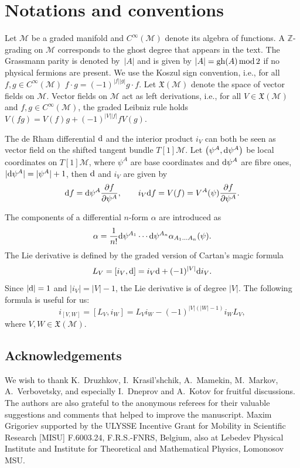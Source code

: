\documentclass[pdftex]{sigma}
\numberwithin{equation}{section}
\theoremstyle{definition}
\renewcommand{\mod}{\,\rm mod \,}
\newcommand{\p}[1]{|#1|}
\newcommand{\gh}[1]{\mathrm{gh}(#1)}
\begin{document}
\appendix
\section{Notations and conventions}
Let $\mathcal{M}$ be a graded manifold and $C^{\infty}(\mathcal{M})$ denote its algebra of functions. A $\mathbb{Z}$-grading on $\mathcal{M}$ corresponds to the ghost degree that appears in the text. The Grassmann parity is denoted by~$\p{A}$ and is given by $\p{A}=\gh{A}\mod 2$ if no physical fermions are present. We use the Koszul sign convention, i.e., for all $f,g\in C^{\infty}(\mathcal{M})$ $f\cdot g=(-1)^{|f||g|}g\cdot f$. Let $\mathfrak{X}(\mathcal{M})$ denote the space of vector fields on $\mathcal{M}$. Vector fields on $\mathcal{M}$ act as left derivations, i.e., for all $V\in \mathfrak{X}(\mathcal{M})$ and $f,g\in C^{\infty}(\mathcal{M})$, the graded Leibniz rule holds $V(fg)=V(f)g+(-1)^{|V||f|}fV(g)$.

The de Rham differential ${\rm d}$ and the interior product $i_V$ can both be seen as vector field on the shifted tangent bundle $T[1]\mathcal{M}$. Let $\bigl(\psi^A,{\rm d}\psi^A\bigr)$ be local coordinates on $T[1]\mathcal{M}$, where $\psi^A$ are base coordinates and ${\rm d}\psi^A$ are fibre ones, $\p{{\rm d}\psi^A}=\p{\psi^A}+1$, then ${\rm d}$ and $i_V$ are given by
\begin{equation*}
 {\rm d}f={\rm d}\psi^A\frac{\partial f}{\partial \psi^A},\qquad i_V{\rm d}f=V(f)=V^A(\psi)\frac{\partial f}{\partial \psi^A}.
\end{equation*}

The components of a differential $n$-form $\alpha$ are introduced as
\begin{equation*}
 \alpha=\frac{1}{n!}{\rm d}\psi^{A_1}\cdots {\rm d}\psi^{A_n}\alpha_{A_1\dots A_n}(\psi).
\end{equation*}
The Lie derivative is defined by the graded version of Cartan's magic formula
\begin{equation*}
 L_V=[i_V,{\rm d}]=i_V{\rm d}+(-1)^{|V|}{\rm d}i_V.
\end{equation*}
Since $|{\rm d}|=1$ and $|i_V|=|V|-1$, the Lie derivative is of degree $|V|$. The following formula is useful for us:{\samepage
\begin{equation*}
 i_{[V,W]}=[L_{V},i_{W}]=L_{V}i_{W}-(-1)^{|V|(|W|-1)}i_{W}L_{V},
\end{equation*}
where $V,W\in \mathfrak{X}(\mathcal{M})$.}

\subsection*{Acknowledgements}
We wish to thank K.~Druzhkov, I.~Krasil'shchik, A.~Mamekin, M.~Markov, A.~Verbovetsky, and especially I.~Dneprov and A.~Kotov for fruitful discussions. The authors are also grateful to the anonymous referees for their valuable suggestions and comments that helped to improve the manuscript.
Maxim Grigoriev supported by the ULYSSE Incentive
Grant for Mobility in Scientific Research [MISU] F.6003.24, F.R.S.-FNRS, Belgium, also at Lebedev Physical Institute and Institute for Theoretical and Mathematical Physics, Lomonosov MSU.
\end{document}
